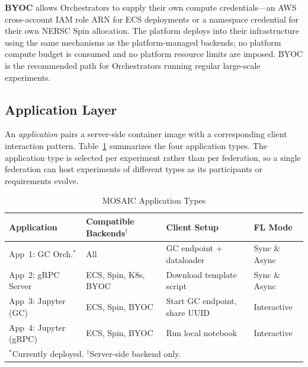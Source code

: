 \documentclass[conference]{IEEEtran}
\begin{document}
\textbf{BYOC} allows Orchestrators to supply their own compute
credentials---an AWS cross-account IAM role ARN for ECS deployments or
a namespace credential for their own NERSC Spin allocation. The
platform deploys into their infrastructure using the same mechanisms as
the platform-managed backends; no platform compute budget is consumed
and no platform resource limits are imposed. BYOC is the recommended
path for Orchestrators running regular large-scale experiments.

\subsection{Application Layer}

An \emph{application} pairs a server-side container image with a
corresponding client interaction pattern. Table~\ref{tab:apps}
summarizes the four application types. The application type is selected
per experiment rather than per federation, so a single federation can
host experiments of different types as its participants or requirements
evolve.

\begin{table}[t]
\caption{MOSAIC Application Types}
\label{tab:apps}
\begin{center}
\renewcommand{\arraystretch}{1.15}
\begin{tabular}{p{1.5cm} p{1.6cm} p{2.0cm} p{1.6cm}}
\toprule
\textbf{Application} & \textbf{Compatible Backends$^{\dagger}$} & \textbf{Client Setup} & \textbf{FL Mode} \\
\midrule
App~1: GC Orch.$^{*}$
  & All
  & GC endpoint + dataloader
  & Sync \& Async \\
App~2: gRPC Server
  & ECS, Spin, K8s, BYOC
  & Download template script
  & Sync \& Async \\
App~3: Jupyter (GC)
  & ECS, Spin, BYOC
  & Start GC endpoint, share UUID
  & Interactive \\
App~4: Jupyter (gRPC)
  & ECS, Spin, BYOC
  & Run local notebook
  & Interactive \\
\bottomrule
\multicolumn{4}{l}{\small $^{*}$Currently deployed. $^{\dagger}$Server-side backend only.}
\end{tabular}
\end{center}
\end{table}
\end{document}
